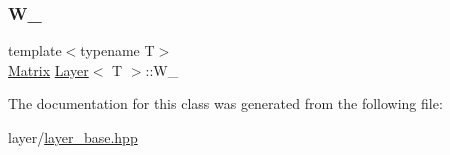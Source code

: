 \mbox{\label{class_layer_a1dd882f1ce286b7d36aa4d14c815b2d3}} 
\subsubsection{\texorpdfstring{W\_}{W\_}}
{\footnotesize\ttfamily template$<$typename T$>$ \\
\mbox{\hyperlink{class_layer_a22b1e7286096aa62bd245536c8ebdaf1}{Matrix}} \mbox{\hyperlink{class_layer}{Layer}}$<$ T $>$\+::W\+\_\+\hspace{0.3cm}{\ttfamily [protected]}}



The documentation for this class was generated from the following file\+:\begin{DoxyCompactItemize}
\item 
layer/\mbox{\hyperlink{layer__base_8hpp}{layer\+\_\+base.\+hpp}}\end{DoxyCompactItemize}
